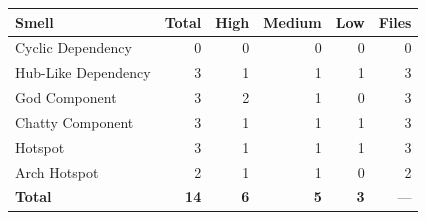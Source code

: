 \begin{tabular}{l|r|r|r|r|r}
\hline
\textbf{Smell} & \textbf{Total} & \textbf{High} & \textbf{Medium} & \textbf{Low} & \textbf{Files} \\
\hline
Cyclic Dependency   & 0  & 0 & 0 & 0 & 0 \\
Hub-Like Dependency & 3  & 1 & 1 & 1 & 3 \\
God Component       & 3  & 2 & 1 & 0 & 3 \\
Chatty Component    & 3  & 1 & 1 & 1 & 3 \\
Hotspot             & 3  & 1 & 1 & 1 & 3 \\
Arch Hotspot        & 2  & 1 & 1 & 0 & 2 \\
\hline
\textbf{Total}      & \textbf{14} & \textbf{6} & \textbf{5} & \textbf{3} & --- \\
\hline
\end{tabular}